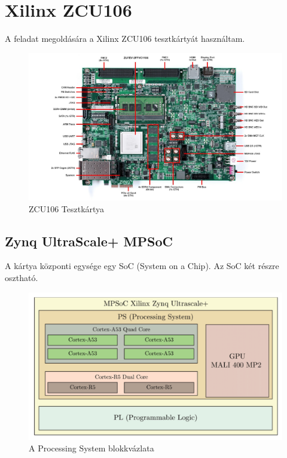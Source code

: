 \chapter{Xilinx ZCU106}
A feladat megoldására a Xilinx ZCU106 tesztkártyát használtam.\cite{ZCU106}

\begin{figure}[!ht]
    \centering
    \includegraphics[width=150mm, keepaspectratio]{figures/ZCU106.jpg}
    \caption{ZCU106 Tesztkártya}
\end{figure}

\section{Zynq UltraScale+ MPSoC}
A kártya központi egysége egy SoC (System on a Chip). Az SoC két részre osztható.

\begin{figure}[!ht]
    \centering
    \includegraphics[width=150mm, keepaspectratio]{figures/PS.png}
    \caption{A Processing System blokkvázlata}
\end{figure}

